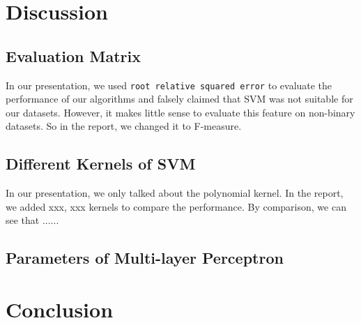\documentclass[11pt]{article}
\begin{document}
\section{Discussion}

\subsection{Evaluation Matrix}
In our presentation, we used \texttt{root relative squared error} to evaluate the performance of our algorithms and falsely claimed that SVM was not suitable for our datasets. However, it makes little sense to evaluate this feature on  non-binary datasets. So in the report, we changed it to F-measure.

\subsection{Different Kernels of SVM}
In our presentation, we only talked about the polynomial kernel. In the report, we added xxx, xxx kernels to compare the performance. By comparison, we can see that ......


\subsection{Parameters of Multi-layer Perceptron}
 
\section{Conclusion}



\newpage


\end{document}

